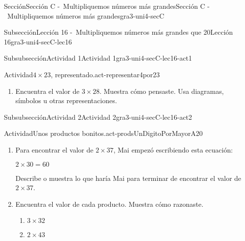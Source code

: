 \documentclass[twoside,14pt,]{extarticle}
\begin{document}
\begin{sectionptx}{Sección}{Sección C -~Multipliquemos números más grandes}{}{Sección C -~Multipliquemos números más grandes}{}{}{gra3-uni4-secC}
\begin{subsectionptx}{Subsección}{Lección 16 -~Multipliquemos números más grandes que 20}{}{Lección 16}{}{}{gra3-uni4-secC-lec16}
\begin{subsubsectionptx}{Subsubsección}{Actividad 1}{}{Actividad 1}{}{}{gra3-uni4-secC-lec16-act1}
\begin{activity}{Actividad}{\(4\times 23\), representado.}{act-representar4por23}
\begin{enumerate}
\begin{sidebyside}{2}{0}{0.3}{0.05}
\begin{sbspanel}{0.05}[center]
C%
\end{sbspanel}%
\begin{sbspanel}{0.6}[center]%
\texttt{[image: external/svg-source/tikz-file-152973.pdf]}
\end{sbspanel}%
\end{sidebyside}%
\begin{sidebyside}{2}{0}{0.3}{0.05}%
\begin{sbspanel}{0.05}[center]%
D%
\end{sbspanel}%
\begin{sbspanel}{0.6}[center]%
\texttt{[image: external/svg-source/tikz-file-152974.pdf]}
\end{sbspanel}%
\end{sidebyside}%
%
\begin{enumerate}
\item{}¿Qué observas sobre los números de sus diagramas?%
\item{}¿Cuál diagrama usarías para encontrar el valor de \(4\times 23\)? Explica tu razonamiento.%
\end{enumerate}
\item{}Encuentra el valor de \(3\times 28\). Muestra cómo pensaste. Usa diagramas, símbolos u otras representaciones.%
\end{enumerate}
\end{activity}%
\end{subsubsectionptx}
%
%
\typeout{************************************************}
\typeout{************************************************}
%
\begin{subsubsectionptx}{Subsubsección}{Actividad 2}{}{Actividad 2}{}{}{gra3-uni4-secC-lec16-act2}
\begin{activity}{Actividad}{Unos productos bonitos.}{act-prodsUnDigitoPorMayorA20}%
%
\begin{enumerate}
\item{}Para encontrar el valor de \(2\times 37\), Mai empezó escribiendo esta ecuación:%
\par
\(2 \times 30 = 60\)%
\par
Describe o muestra lo que haría Mai para terminar de encontrar el valor de \(2\times 37\).%
\item{}Encuentra el valor de cada producto. Muestra cómo razonaste.%
%
\begin{enumerate}
\item{}\(\displaystyle 3\times 32\)%
\item{}\(\displaystyle 2\times 43\)%

\end{enumerate}
\end{enumerate}
\end{activity}
\end{subsubsectionptx}
\end{subsectionptx}
\end{sectionptx}
\end{document}
